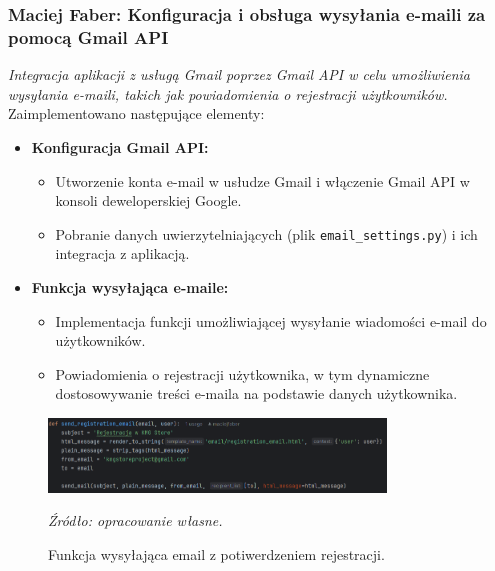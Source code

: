 \documentclass[12pt,a4paper,oneside]{article}
\theoremstyle{definition}
\numberwithin{equation}{section}
\begin{document}
\subsubsection{Maciej Faber: Konfiguracja i obsługa wysyłania e-maili za pomocą Gmail API}
\label{section:1.3.41}
\textit{
Integracja aplikacji z usługą Gmail poprzez Gmail API w celu umożliwienia wysyłania e-maili, takich jak powiadomienia o rejestracji użytkowników.
}
Zaimplementowano następujące elementy:
\begin{itemize}
    \item \textbf{Konfiguracja Gmail API:}
    \begin{itemize}
        \item Utworzenie konta e-mail w usłudze Gmail i włączenie Gmail API w konsoli deweloperskiej Google.
        \item Pobranie danych uwierzytelniających (plik \texttt{email\_settings.py}) i ich integracja z aplikacją.
    \end{itemize}
    \item \textbf{Funkcja wysyłająca e-maile:}
    \begin{itemize}
        \item Implementacja funkcji umożliwiającej wysyłanie wiadomości e-mail do użytkowników.
        \item Powiadomienia o rejestracji użytkownika, w tym dynamiczne dostosowywanie treści e-maila na podstawie danych użytkownika.
    \end{itemize}
\end{itemize}
\begin{figure}[H]
    \centering
    \includegraphics[width=0.8\textwidth]{images/krzysztofBImages/send_email.png}
    \caption{Funkcja wysyłająca email z potiwerdzeniem rejestracji.}
    \emph{Źródło: opracowanie własne.}
    \label{fig:email_notification}
\end{figure}
%
%
\end{document}

